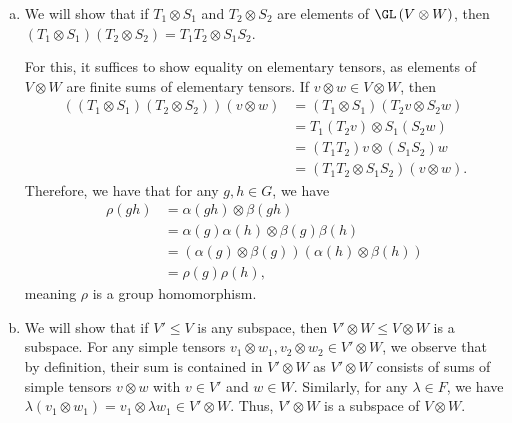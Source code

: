 \documentclass[10pt]{mypackage}
\begin{document}
\begin{solution}\hfill
  \begin{enumerate}[(a)]
    \item We will show that if $T_1\otimes S_1$ and $T_2\otimes S_2$ are elements of $\GL\left( V\otimes W \right)$, then $\left( T_1\otimes S_1 \right)\left( T_2\otimes S_2 \right) = T_1T_2\otimes S_1S_2$.

      For this, it suffices to show equality on elementary tensors, as elements of $V\otimes W$ are finite sums of elementary tensors. If $v\otimes w\in V\otimes W$, then
      \begin{align*}
        \left( \left( T_1\otimes S_1 \right)\left( T_2\otimes S_2 \right) \right)\left( v\otimes w \right) &= \left( T_1\otimes S_1 \right) \left( T_2v\otimes S_2w \right)\\
                                                                                                           &= T_1\left( T_2v \right)\otimes S_1\left( S_2 w \right)\\
                                                                                                           &= \left( T_1T_2 \right)v\otimes \left( S_1S_2 \right)w\\
                                                                                                           &= \left( T_1T_2\otimes S_1S_2 \right)\left( v\otimes w \right).
      \end{align*}
      Therefore, we have that for any $g,h\in G$, we have
      \begin{align*}
        \rho\left( gh \right) &= \alpha\left( gh \right)\otimes \beta\left( gh \right)\\
                              &= \alpha(g)\alpha(h)\otimes \beta(g)\beta(h)\\
                              &= \left( \alpha(g)\otimes \beta(g) \right)\left( \alpha(h)\otimes \beta(h) \right)\\
                              &= \rho(g)\rho(h),
      \end{align*}
      meaning $\rho$ is a group homomorphism.
    \item We will show that if $V'\leq V$ is any subspace, then $V'\otimes W\leq V\otimes W$ is a subspace. For any simple tensors $v_1\otimes w_1,v_2\otimes w_2\in V'\otimes W$, we observe that by definition, their sum is contained in $V'\otimes W$ as $V'\otimes W$ consists of sums of simple tensors $v\otimes w$ with $v\in V'$ and $w\in W$. Similarly, for any $\lambda\in F$, we have $\lambda\left( v_1\otimes w_1 \right) = v_1\otimes \lambda w_1\in V'\otimes W$. Thus, $V'\otimes W$ is a subspace of $V\otimes W$.


\end{enumerate}
\end{solution}
\end{document}
